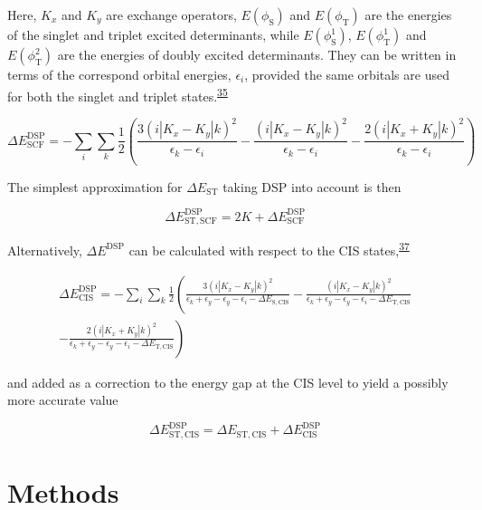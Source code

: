 \documentclass[
  number,
  3p]{elsarticle}
\newcommand{\DeltaE}[2][]{\Delta E^{\mathrm{#1}}_{\mathrm{#2}}}
\newcommand{\DeltaEST}[2][]{\Delta E^{\mathrm{#1}}_{\mathrm{ST,#2}}}
\newcommand{\Integral}[1]{(i | K_x #1 K_y | k )^2}
\begin{document}
Here, \(K_x\) and \(K_y\) are exchange operators,
\(E(\phi_{\mathrm{S}})\) and \(E(\phi_{\mathrm{T}})\) are the energies
of the singlet and triplet excited determinants, while
\(E (\phi_{\mathrm{S}}^{1})\), \(E (\phi_{\mathrm{T}}^{1})\) and
\(E(\phi_{\mathrm{T}}^{2})\) are the energies of doubly excited
determinants. They can be written in terms of the correspond orbital
energies, \(\epsilon_i\), provided the same orbitals are used for both
the singlet and triplet
states.\textsuperscript{\protect\hyperlink{ref-benamorSpinPolarizationElectronic2020}{35}}

\[
\DeltaE[DSP]{SCF} =  - \sum_{i}\sum_{k}
    \frac{1}{2} \left( 
    \frac{3 \Integral{-}}{\epsilon_k - \epsilon_i}
    - \frac{\Integral{-}}{\epsilon_k - \epsilon_i}
    - \frac{2 \Integral{+}}{\epsilon_k - \epsilon_i}
    \right)
\]

The simplest approximation for \(\DeltaE{ST}\) taking DSP into account
is then

\[
\DeltaEST[DSP]{SCF} = 2K + \DeltaE[DSP]{SCF}
\]

Alternatively, \(\DeltaE[DSP]{}\) can be calculated with respect to the
CIS
states,\textsuperscript{\protect\hyperlink{ref-head-gordonDoublesCorrectionElectronic1994}{37}}

\[
\begin{split}
\DeltaE[DSP]{CIS} =  - \sum_{i}\sum_{k}
    \frac{1}{2} \left( 
    \frac{3 \Integral{-}}{\epsilon_k + \epsilon_y - \epsilon_y - \epsilon_i - \DeltaE{S,CIS}}
    - \frac{\Integral{-}}{\epsilon_k + \epsilon_y - \epsilon_y - \epsilon_i - \DeltaE{T,CIS}} \right. \\
    \left. - \frac{2 \Integral{+}}{\epsilon_k + \epsilon_y - \epsilon_y - \epsilon_i - \DeltaE{T,CIS}}
    \right)
\end{split}
\]

and added as a correction to the energy gap at the CIS level to yield a
possibly more accurate value

\[
\DeltaEST[DSP]{CIS} = \DeltaEST{CIS} + \DeltaE[DSP]{CIS}
\]

\hypertarget{methods}{%
\section{Methods}\label{methods}}
\end{document}
